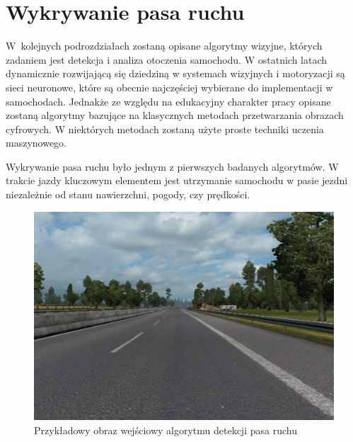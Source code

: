 
\section{Wykrywanie pasa ruchu}

\label{sec:lane_detection}

W~kolejnych podrozdziałach zostaną opisane algorytmy wizyjne, których zadaniem jest detekcja i analiza otoczenia samochodu. %
W ostatnich latach dynamicznie rozwijającą się dziedziną w systemach wizyjnych i motoryzacji są sieci neuronowe, które są obecnie najczęściej wybierane do implementacji w samochodach. 
Jednakże ze względu na edukacyjny charakter pracy opisane zostaną algorytmy bazujące na klasycznych metodach przetwarzania obrazach cyfrowych. %
W niektórych metodach zostaną użyte proste techniki uczenia maszynowego.


Wykrywanie pasa ruchu było jednym z pierwszych badanych algorytmów. %
W trakcie jazdy kluczowym elementem jest utrzymanie samochodu w pasie jezdni niezależnie od stanu nawierzchni, pogody, czy prędkości.

\begin{figure}
  \centering
  \includegraphics[width=12cm]{img/input.png}
  \caption{Przykładowy obraz wejściowy algorytmu detekcji pasa ruchu}
  \label{fig:inputimg}
\end{figure}

